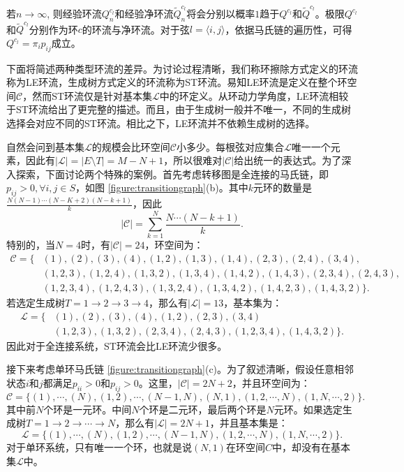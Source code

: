 若$n \to \infty$, 则经验环流$Q_n^{c_l}$和经验净环流$\tilde{Q}_n^{c_l}$将会分别以概率$1$趋于$Q^{c_l}$和$\tilde{Q}^{c_l}$。极限$Q^{c_l}$和$\tilde{Q}^{c_l}$分别作为环$c$的环流与净环流。对于弦$l=\langle i,j \rangle$，依据马氏链的遍历性，可得$Q^{c_l} = \pi_i p_{ij}$成立。

下面将简述两种类型环流的差异。为讨论过程清晰，我们称环擦除方式定义的环流称为LE环流，生成树方式定义的环流称为ST环流。易知LE环流是定义在整个环空间$\mathcal{C}$，然而ST环流仅是针对基本集$\mathcal{L}$中的环定义。从环动力学角度，LE环流相较于ST环流给出了更完整的描述。而且，由于生成树一般并不唯一，不同的生成树选择会对应不同的ST环流。相比之下，LE环流并不依赖生成树的选择。

自然会问到基本集$\mathcal{L}$的规模会比环空间$\mathcal{C}$小多少。每根弦对应集合$\mathcal{L}$唯一一个元素，因此有$|\mathcal{L}| = |E\setminus T| = M-N+1$，所以很难对$|\mathcal{C}|$给出统一的表达式。为了深入探索，下面讨论两个特殊的案例。首先考虑转移图是全连接的马氏链，即$p_{ij}>0, \forall i,j \in S$，如图 \ref{figure:transitiongraph}(b)。其中$k$元环的数量是$\frac{N (N-1) \cdots (N-K+2)(N-k+1)}{k}$，因此
\begin{equation*}
    |\mathcal{C}| = \sum_{k=1}^N\frac{N\cdots (N-k+1)}{k}.
\end{equation*}
特别的，当$N=4$时，有$|\mathcal{C}|=24$，环空间为：
\begin{align*}
    \mathcal{C} = \{&(1),(2),(3),(4),(1,2),(1,3),(1,4),(2,3),(2,4),(3,4),\\
    &(1,2,3),(1,2,4),(1,3,2),(1,3,4),(1,4,2),(1,4,3),(2,3,4),(2,4,3),\\
    &(1,2,3,4),(1,2,4,3),(1,3,2,4),(1,3,4,2),(1,4,2,3),(1,4,3,2)\}.
\end{align*}
若选定生成树$T = 1\to 2\to 3\to 4$，那么有$|\mathcal{L}|=13$，基本集为：
\begin{align*}
    \mathcal{L} = \{&(1),(2),(3),(4),(1,2),(2,3),(3,4)\\
    &(1,2,3),(1,3,2),(2,3,4),(2,4,3),(1,2,3,4),(1,4,3,2)\}.
\end{align*}
因此对于全连接系统，ST环流会比LE环流少很多。

接下来考虑单环马氏链 \ref{figure:transitiongraph}(c)。为了叙述清晰，假设任意相邻状态$i$和$j$都满足$p_{ii}>0$和$p_{ij}>0$。这里，$|\mathcal{C}| = 2N +2$，并且环空间为：
\begin{equation}\label{cycle_space}
    \mathcal{C} = \{(1),\cdots,(N),(1,2),\cdots,(N-1,N),(N,1),(1,2,\cdots,N),(1,N,\cdots,2)\}.
\end{equation}
其中前$N$个环是一元环。中间$N$个环是二元环，最后两个环是$N$元环。如果选定生成树$T = 1\to 2\to\cdots \to N$，那么有$|\mathcal{L}| = 2N + 1$，并且基本集是：
\begin{equation*}
    \mathcal{L} = \{(1),\cdots,(N),(1,2),\cdots,(N-1,N),(1,2,\cdots,N),(1,N,\cdots,2)\}.
\end{equation*}
对于单环系统，只有唯一一个环，也就是说$(N, 1)$在环空间$C$中，却没有在基本集$\mathcal{L}$中。

